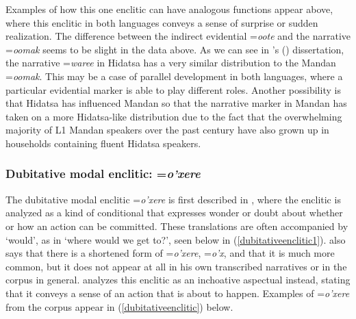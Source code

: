 Examples of how this one enclitic can have analogous functions appear above, where this enclitic in both languages conveys a sense of surprise or sudden realization. The difference between the indirect evidential =\textit{oote} and the narrative =\textit{oomak} seems to be slight in the data above. As we can see in \citeauthor{park2012}'s (\citeyear[256]{park2012}) dissertation, the narrative =\textit{waree} in Hidatsa has a very similar distribution to the Mandan =\textit{oomak}. This may be a case of parallel development in both languages, where a particular evidential marker is able to play different roles. Another possibility is that Hidatsa has influenced Mandan so that the narrative marker in Mandan has taken on a more Hidatsa-like distribution due to the fact that the overwhelming majority of L1 Mandan speakers over the past century have also grown up in households containing fluent Hidatsa speakers.

\subsubsection{Dubitative modal enclitic: =\textit{o'xere}}

The dubitative modal enclitic =\textit{o'xere} is first described in \citet[19]{kennard1936}, where the enclitic is analyzed as a kind of conditional that expresses wonder or doubt about whether or how an action can be committed. These translations are often accompanied by `would', as in `where would we get to?', seen below in (\ref{dubitativeenclitic1}). \citeauthor{kennard1936} also says that there is a shortened form of =\textit{o'xere}, =\textit{o'x}, and that it is much more common, but it does not appear at all in his own transcribed narratives or in the corpus in general. \citet[460]{hollow1970} analyzes this enclitic as an inchoative aspectual instead, stating that it conveys a sense of an action that is about to happen. Examples of =\textit{o'xere} from the corpus appear in (\ref{dubitativeenclitic}) below.

